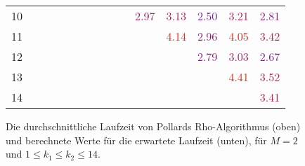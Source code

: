 \documentclass[a4paper, 11pt, ngerman]{article}
\theoremstyle{definition}
\theoremstyle{plain}
\theoremstyle{remark}
\begin{document}
\begin{figure}
\begin{tabular}{c|cccccccccccccc}
        10                   &                                  &                                  &                                  &                                  &                                  &                                  &                                  &                                  &                                  & \textcolor[HTML]{ 93206b }{2.97} & \textcolor[HTML]{ 9f205f }{3.13} & \textcolor[HTML]{ 70208e }{2.50} & \textcolor[HTML]{ a52059 }{3.21} & \textcolor[HTML]{ 872077 }{2.81} \\
        11                   &                                  &                                  &                                  &                                  &                                  &                                  &                                  &                                  &                                  &                                  & \textcolor[HTML]{ ea2014 }{4.14} & \textcolor[HTML]{ 92206c }{2.96} & \textcolor[HTML]{ e4201a }{4.05} & \textcolor[HTML]{ b4204a }{3.42} \\
        12                   &                                  &                                  &                                  &                                  &                                  &                                  &                                  &                                  &                                  &                                  &                                  & \textcolor[HTML]{ 862078 }{2.79} & \textcolor[HTML]{ 972067 }{3.03} & \textcolor[HTML]{ 7c2082 }{2.67} \\
        13                   &                                  &                                  &                                  &                                  &                                  &                                  &                                  &                                  &                                  &                                  &                                  &                                  & \textcolor[HTML]{ ff2000 }{4.41} & \textcolor[HTML]{ bc2042 }{3.52} \\
        14                   &                                  &                                  &                                  &                                  &                                  &                                  &                                  &                                  &                                  &                                  &                                  &                                  &                                  & \textcolor[HTML]{ b4204a }{3.41} \\
    \end{tabular}

    \caption{Die durchschnittliche Laufzeit von Pollards Rho-Algorithmus (oben) und berechnete Werte für die erwartete Laufzeit (unten), für $M = 2$ und $1 \le k_1 \le k_2 \le 14$. }
    \label{fig:measurements-m2}
\end{figure}
\end{document}
